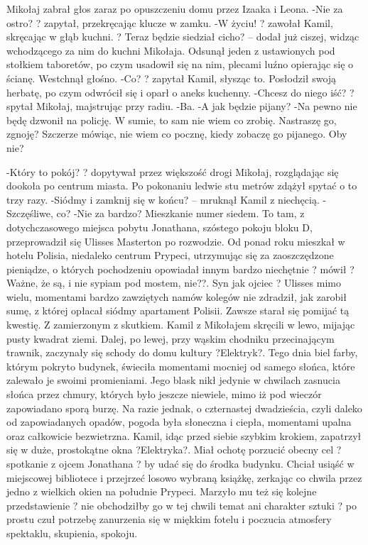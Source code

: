 \documentclass[../MAIN.tex]{subfiles}
\begin{document}
Mikołaj zabrał głos zaraz po opuszczeniu domu przez Izaaka i Leona.
-Nie za ostro? ? zapytał, przekręcając klucze w zamku.
-W życiu! ? zawołał Kamil, skręcając w głąb kuchni. ? Teraz będzie siedział cicho? -- dodał już ciszej, widząc wchodzącego za nim do kuchni Mikołaja. Odsunął jeden z ustawionych pod stołkiem taboretów, po czym usadowił się na nim, plecami luźno opierając się o ścianę. Westchnął głośno.
-Co? ? zapytał Kamil, słysząc to. Posłodził swoją herbatę, po czym odwrócił się i oparł o aneks kuchenny.
-Chcesz do niego iść? ? spytał Mikołaj, majstrując przy radiu.
-Ba.
-A jak będzie pijany?
-Na pewno nie będę dzwonił na policję. W sumie, to sam nie wiem co zrobię. Nastraszę go, zgnoję? Szczerze mówiąc, nie wiem co pocznę, kiedy zobaczę go pijanego. Oby nie?

-Który to pokój? ? dopytywał przez większość drogi Mikołaj, rozglądając się dookoła po centrum miasta. Po pokonaniu ledwie stu metrów zdążył spytać o to trzy razy.
-Siódmy i zamknij się w końcu? -- mruknął Kamil z niechęcią.
-Szczęśliwe, co?
-Nie za bardzo?
Mieszkanie numer siedem.
To tam, z dotychczasowego miejsca pobytu Jonathana, szóstego pokoju bloku D, przeprowadził się Ulisses Masterton po rozwodzie. Od ponad roku mieszkał w hotelu Polisia, niedaleko centrum Prypeci, utrzymując się za zaoszczędzone pieniądze, o których pochodzeniu opowiadał innym bardzo niechętnie ? mówił ?Ważne, że są, i nie sypiam pod mostem, nie??. Syn jak ojciec ? Ulisses mimo wielu, momentami bardzo zawziętych namów kolegów nie zdradził, jak zarobił sumę, z której opłacał siódmy apartament Polisii. Zawsze starał się pomijać tą kwestię. Z zamierzonym z skutkiem.
Kamil z Mikołajem skręcili w lewo, mijając pusty kwadrat ziemi. Dalej, po lewej, przy wąskim chodniku przecinającym trawnik, zaczynały się schody do domu kultury ?Elektryk?. Tego dnia biel farby, którym pokryto budynek, świeciła momentami mocniej od samego słońca, które zalewało je swoimi promieniami. Jego blask nikł jedynie w chwilach zasnucia słońca przez chmury, których było jeszcze niewiele, mimo iż pod wieczór zapowiadano sporą burzę.
Na razie jednak, o czternastej dwadzieścia, czyli daleko od zapowiadanych opadów, pogoda była słoneczna i ciepła, momentami upalna oraz całkowicie bezwietrzna.
Kamil, idąc przed siebie szybkim krokiem, zapatrzył się w duże, prostokątne okna ?Elektryka?. Miał ochotę porzucić obecny cel ? spotkanie z ojcem Jonathana ? by udać się do środka budynku. Chciał usiąść w miejscowej bibliotece i przejrzeć losowo wybraną książkę, zerkając co chwila przez jedno z wielkich okien na południe Prypeci. Marzyło mu też się kolejne przedstawienie ? nie obchodziłby go w tej chwili temat ani charakter sztuki ? po prostu czuł potrzebę zanurzenia się w miękkim fotelu i poczucia atmosfery spektaklu, skupienia, spokoju.
\end{document}
